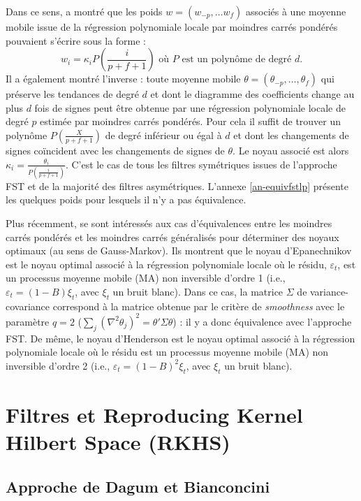 \documentclass[
  11pt,
  french,
  a4paper]{article}
\newcommand\1{\mathds{1}}
\begin{document}
Dans ce sens, \textcite{henderson1916note} a montré que les poids \(w=(w_{-p},\dots w_{f})\) associés à une moyenne mobile issue de la régression polynomiale locale par moindres carrés pondérés pouvaient s'écrire sous la forme :
\[
w_i = \kappa_i P\left(\frac{i}{p+f+1}\right)\text{ où }P\text{ est un polynôme de degré }d.
\]
Il a également montré l'inverse : toute moyenne mobile \(\theta=(\theta_{-p},\dots, \theta_{f})\) qui préserve les tendances de degré \(d\) et dont le diagramme des coefficients change au plus \(d\) fois de signes peut être obtenue par une régression polynomiale locale de degré \(p\) estimée par moindres carrés pondérés.
Pour cela il suffit de trouver un polynôme \(P\left(\frac{X}{p+f+1}\right)\) de degré inférieur ou égal à \(d\) et dont les changements de signes coïncident avec les changements de signes de \(\theta\).
Le noyau associé est alors \(\kappa_i=\frac{ \theta_i}{P\left(\frac{i}{p+f+1}\right)}\).
C'est le cas de tous les filtres symétriques issues de l'approche FST et de la majorité des filtres asymétriques.
L'annexe \ref{an-equivfstlp} présente les quelques poids pour lesquels il n'y a pas équivalence.

Plus récemment, \textcite{LuatiProietti2011} se sont intéressés aux cas d'équivalences entre les moindres carrés pondérés et les moindres carrés généralisés pour déterminer des noyaux optimaux (au sens de Gauss-Markov).
Ils montrent que le noyau d'Epanechnikov est le noyau optimal associé à la régression polynomiale locale où le résidu, \(\varepsilon_t\), est un processus moyenne mobile (MA) non inversible d'ordre 1 (i.e., \(\varepsilon_t=(1-B)\xi_t\), avec \(\xi_t\) un bruit blanc).
Dans ce cas, la matrice \(\Sigma\) de variance-covariance correspond à la matrice obtenue par le critère de \emph{smoothness} avec le paramètre \(q=2\) (\(\sum_{j}(\nabla^{2}\theta_{j})^{2} = \theta'\Sigma\theta\)) : il y a donc équivalence avec l'approche FST.
De même, le noyau d'Henderson est le noyau optimal associé à la régression polynomiale locale où le résidu est un processus moyenne mobile (MA) non inversible d'ordre 2 (i.e., \(\varepsilon_t=(1-B)^2\xi_t\), avec \(\xi_t\) un bruit blanc).

\hypertarget{sec-rkhs}{%
\section{Filtres et Reproducing Kernel Hilbert Space (RKHS)}\label{sec-rkhs}}

\hypertarget{approche-de-dagum-et-bianconcini}{%
\subsection{Approche de Dagum et Bianconcini}\label{approche-de-dagum-et-bianconcini}}
\end{document}
